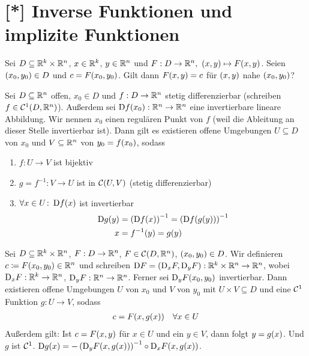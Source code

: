 \section{[*] Inverse Funktionen und implizite Funktionen}
\thispagestyle{pagenumberonly}

\marginnote{[18. Jul]}

Sei $D\subseteq \mathbb{R}^k\times\mathbb{R}^n$, $x\in\mathbb{R}^k$, $y\in\mathbb{R}^n$ und $F:D\to\R^n,~\pair{x,y}\mapsto F\of{x,y}$. Seien $\left(x_0, y_0\right)\in D$ und $c=F\of{x_0, y_0}$. Gilt dann $F\of{x,y} = c$ für $\left(x,y\right)$ nahe $\left(x_0, y_0\right)$?

\begin{satz} %
    \label{satz:invers-funktion}
    Sei $D\subseteq\mathbb{R}^n$ offen, $x_0\in D$ und $f: D\to\mathbb{R}^n$ stetig differenzierbar (schreiben $f\in\mC^1\of{D, \R^n}$). Außerdem sei $\D f\of{x_0}: \R^n\to\R^n$ eine invertierbare lineare Abbildung. Wir nennen $x_0$ einen regulären Punkt von $f$ (weil die Ableitung an dieser Stelle invertierbar ist). Dann gilt es existieren offene Umgebungen $U\subseteq D$ von $x_0$ und $V\subseteq\mathbb{R}^n$ von $y_0 = f\of{x_0}$, sodass
    \begin{enumerate}[label=(\roman*)]
        \item $f: U\to V$ ist bijektiv
        \item $g=f^{-1}: V\to U$ ist in $\mC\of{U, V}$ (stetig differenzierbar)
        \item $\forall x\in U\colon \D f\of{x}$ ist invertierbar
        \begin{align*}
            \D g\of{y} &= \pair{\D f\of{x}}^{-1} = \pair{\D f\of{g\of{y}}}^{-1}\\
            x &= f^{-1}\of{y} = g\of{y}
        \end{align*}
    \end{enumerate}
\end{satz}

\begin{satz} %
    \label{satz:implizit-funktion}
    Sei $D\subseteq\mathbb{R}^k\times\mathbb{R}^n$, $F: D\rightarrow{}\mathbb{R}^n$, $F\in\mC\of{D, \R^n}$, $\left(x_0, y_0\right)\in D$. Wir definieren $c\coloneqq F\of{x_0, y_0}\in\R^n$ und schreiben $\operatorname{D\!} F = \left(\text{D}_x F, \text{D}_y F\right): \mathbb{R}^k\times \mathbb{R}^n\to\mathbb{R}^n$, wobei $\text{D}_x F: \mathbb{R}^k\to\mathbb{R}^n$, $\text{D}_y F: \mathbb{R}^n\to\mathbb{R}^n$. Ferner sei $\text{D}_y F\of{x_0, y_0}$ invertierbar. Dann existieren offene Umgebungen $U$ von $x_0$ und $V$ von $y_0$ mit $U\times V \subseteq D$ und eine $\mathcal{C}^{1}$ Funktion $g: U\to V$, sodass
    \begin{align*}
        c = F\of{x, g\of{x}}\quad\forall x\in U
    \end{align*}
    Außerdem gilt: Ist $c=F\of{x,y}$ für $x\in U$ und ein $y\in V$, dann folgt $y=g\of{x}$. Und $g$ ist $\mathcal{C}^1$. $\D g\of{x} = -\pair{\text{D}_y F\of{x, g\of{x}}}^{-1}\circ \text{D}_x F\of{x,g\of{x}}$.
\end{satz}

